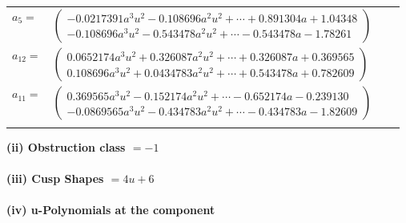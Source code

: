 \documentclass[1p]{elsarticle_modified}
\theoremstyle{definition}
\begin{document}
\begin{tabular}{m{7pt} m{180pt} m{7pt} m{180pt} }
\flushright $a_{5}=$&$\begin{pmatrix}-0.0217391 a^{3} u^{2}-0.108696 a^{2} u^{2}+\cdots+0.891304 a+1.04348\\-0.108696 a^{3} u^{2}-0.543478 a^{2} u^{2}+\cdots-0.543478 a-1.78261\end{pmatrix}$ \\
\flushright $a_{12}=$&$\begin{pmatrix}0.0652174 a^{3} u^{2}+0.326087 a^{2} u^{2}+\cdots+0.326087 a+0.369565\\0.108696 a^{3} u^{2}+0.0434783 a^{2} u^{2}+\cdots+0.543478 a+0.782609\end{pmatrix}$ \\
\flushright $a_{11}=$&$\begin{pmatrix}0.369565 a^{3} u^{2}-0.152174 a^{2} u^{2}+\cdots-0.652174 a-0.239130\\-0.0869565 a^{3} u^{2}-0.434783 a^{2} u^{2}+\cdots-0.434783 a-1.82609\end{pmatrix}$\\&\end{tabular}
\flushleft \textbf{(ii) Obstruction class $= -1$}\\~\\
\flushleft \textbf{(iii) Cusp Shapes $= 4 u+6$}\\~\\
\newpage\renewcommand{\arraystretch}{1}
\flushleft \textbf{(iv) u-Polynomials at the component}\newline \\
\end{document}
